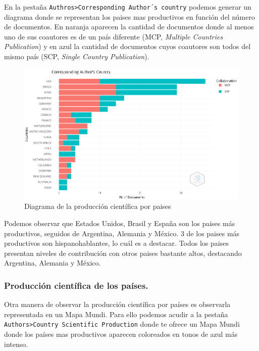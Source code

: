 \documentclass[
]{article}
\begin{document}
En la pestaña
\texttt{Authros\textgreater{}Corresponding\ Author´s\ country} podemos
generar un diagrama donde se representan los paises mas productivos en
función del número de documentos. En naranja aparecen la cantidad de
documentos donde al menos uno de sus coautores es de un país diferente
(MCP, \emph{Multiple Countries Publication}) y en azul la cantidad de
documentos cuyos coautores son todos del mismo país (SCP, \emph{Single
Country Publication}).

\begin{figure}
\centering
\includegraphics{CorrespondingAuthorsCountry.png}
\caption{Diagrama de la producción científica por paises}
\end{figure}

Podemos observar que Estados Unidos, Brasil y España son los paises más
productivos, seguidos de Argentina, Alemania y México. 3 de los paises
más productivos son hispanohablantes, lo cuál es a destacar. Todos los
paises presentan niveles de contribución con otros paises bastante
altos, destacando Argentina, Alemania y México.

\hypertarget{producciuxf3n-cientuxedfica-de-los-pauxedses.}{%
\subsubsection{Producción científica de los
países.}\label{producciuxf3n-cientuxedfica-de-los-pauxedses.}}

Otra manera de observar la producción científica por países es
observarla representada en un Mapa Mundi. Para ello podemos acudir a la
pestaña \texttt{Authors\textgreater{}Country\ Scientific\ Production}
donde te ofrece un Mapa Mundi donde los países mas productivos aparecen
coloreados en tonos de azul más intenso.
\end{document}
